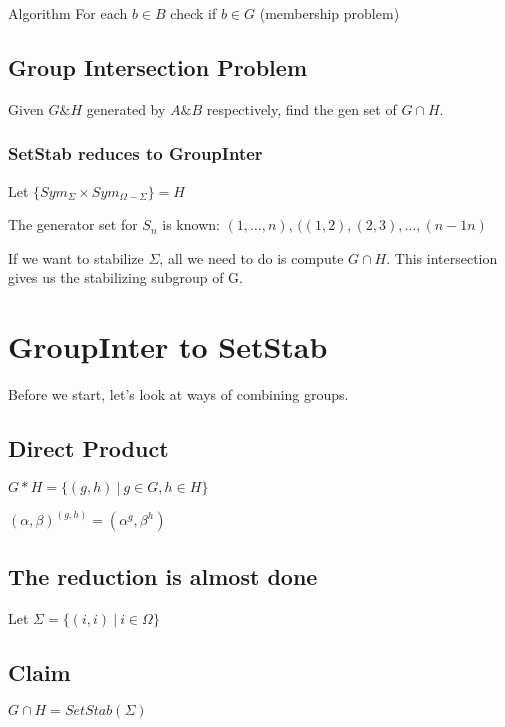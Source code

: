 Algorithm
For each $b\in B$ check if $b\in G$ (membership problem)

\subsection{Group Intersection Problem}
Given $G \& H$ generated by $A \& B$ respectively, find the gen set of $G\cap H$.

\subsubsection{SetStab reduces to GroupInter}
Let $\{Sym_{\Sigma} \times Sym_{\Omega - \Sigma}\} = H$

The generator set for $S_n$ is known: $(1,\ldots,  n)$, $((1, 2), (2, 3), \ldots, (n-1
n)$

If we want to stabilize $\Sigma$, all we need to do is compute $G\cap H$. This intersection gives us the stabilizing subgroup of G.


\section{GroupInter to SetStab}
Before we start, let's look at ways of combining groups.

\subsection{Direct Product}
$G*H=\{(g,h) ~|~ g \in G, h \in H\}$

$(\alpha,\beta)^{(g,h)}=(\alpha^g,\beta^h)$

\subsection{The reduction is almost done}
Let $\Sigma=\{(i,i) ~|~ i \in \Omega \}$

\subsection{Claim}
$G \cap H=SetStab(\Sigma)$

